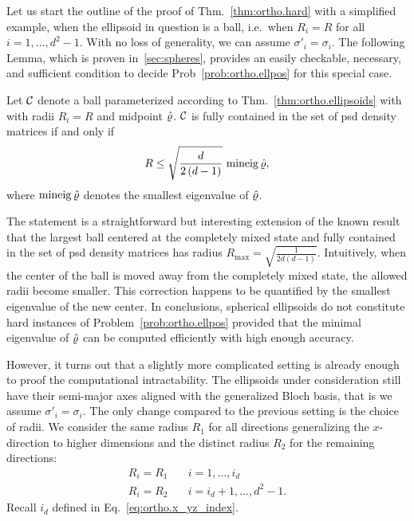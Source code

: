 Let us start the outline of the proof of Thm.~\ref{thm:ortho.hard} with a simplified example, when the ellipsoid in question is a ball, i.e.\ when $R_{i}=R$ for all $i=1,\ldots,d^{2}-1$.
With no loss of generality, we can assume $\sigma'_i = \sigma_i$.
The following Lemma, which is proven in~\ref{sec:spheres}, provides an easily checkable, necessary, and sufficient condition to decide Prob~\ref{prob:ortho.ellpos} for this special case.
\begin{lemma}\label{lem:ortho.spheres}
  Let $\mathcal{C}$ denote a ball parameterized according to Thm.~\ref{thm:ortho.ellipsoids} with with radii $R_i=R$ and midpoint $\hat{\varrho}$.
  $\mathcal{C}$ is fully contained in the set of psd density matrices if and only if
  \begin{equation}
    R\leq\sqrt{\frac{d}{2\left(d-1\right)}} \, \operatorname{mineig} \hat{\varrho},
  \end{equation}
  where $\operatorname{mineig}\hat{\varrho}$ denotes the smallest eigenvalue of $\hat{\varrho}$.
\end{lemma}
The statement is a straightforward but interesting extension of the known result that the largest ball centered at the completely mixed state and fully contained in the set of psd density matrices has radius $R_{\mathrm{max}}=\sqrt{\frac{1}{2d\left(d-1\right)}}$.
Intuitively, when the center of the ball is moved away from the completely mixed state, the allowed radii become smaller.
This correction happens to be quantified by the smallest eigenvalue of the new center.
In conclusions, spherical ellipsoids do not constitute hard instances of Problem~\ref{prob:ortho.ellpos} provided that the minimal eigenvalue of $\hat{\varrho}$ can be computed efficiently with high enough accuracy.

However, it turns out that a slightly more complicated setting is already enough to proof the computational intractability.
The ellipsoids under consideration still have their semi-major axes aligned with the generalized Bloch basis, that is we assume $\sigma'_i = \sigma_i$.
The only change compared to the previous setting is the choice of radii.
We consider the same radius $R_{1}$ for all directions generalizing the $x$-direction to higher dimensions and the distinct radius $R_{2}$ for the remaining directions:
\begin{equation}
  \label{eq:ortho.subclass}
  \begin{split}
    R_{i}=R_{1} &\quad i=1,\ldots,i_{d}\\
    R_{i}=R_{2} &\quad i=i_{d}+1,\ldots,d^{2}-1.
  \end{split}
\end{equation}
Recall $i_d$ defined in Eq.~\eqref{eq:ortho.x_yz_index}.

